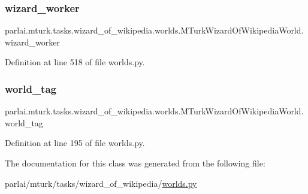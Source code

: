 \subsubsection{\texorpdfstring{wizard\+\_\+worker}{wizard\_worker}}
{\footnotesize\ttfamily parlai.\+mturk.\+tasks.\+wizard\+\_\+of\+\_\+wikipedia.\+worlds.\+M\+Turk\+Wizard\+Of\+Wikipedia\+World.\+wizard\+\_\+worker}



Definition at line 518 of file worlds.\+py.

\mbox{\label{classparlai_1_1mturk_1_1tasks_1_1wizard__of__wikipedia_1_1worlds_1_1MTurkWizardOfWikipediaWorld_ae3c5ecb7dfbcfd5ede55035fa23d3722}} 
\subsubsection{\texorpdfstring{world\+\_\+tag}{world\_tag}}
{\footnotesize\ttfamily parlai.\+mturk.\+tasks.\+wizard\+\_\+of\+\_\+wikipedia.\+worlds.\+M\+Turk\+Wizard\+Of\+Wikipedia\+World.\+world\+\_\+tag}



Definition at line 195 of file worlds.\+py.



The documentation for this class was generated from the following file\+:\begin{DoxyCompactItemize}
\item 
parlai/mturk/tasks/wizard\+\_\+of\+\_\+wikipedia/\hyperlink{parlai_2mturk_2tasks_2wizard__of__wikipedia_2worlds_8py}{worlds.\+py}\end{DoxyCompactItemize}
